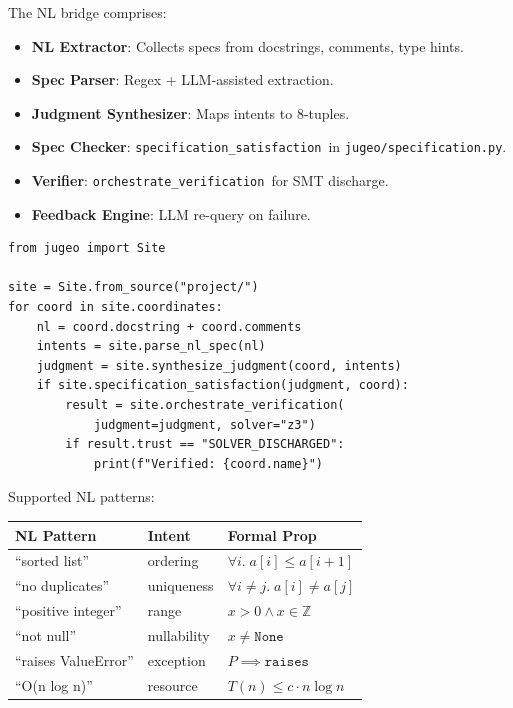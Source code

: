 \documentclass[11pt]{article}
\newcommand{\OrchestrateVerif}{\texttt{orchestrate\_verification}}
\newcommand{\SpecSatisfaction}{\texttt{specification\_satisfaction}}
\begin{document}
The NL bridge comprises:
\begin{itemize}[noitemsep]
  \item \textbf{NL Extractor}: Collects specs from docstrings,
        comments, type hints.
  \item \textbf{Spec Parser}: Regex + LLM-assisted extraction.
  \item \textbf{Judgment Synthesizer}: Maps intents to 8-tuples.
  \item \textbf{Spec Checker}: \SpecSatisfaction\ in
        \texttt{jugeo/specification.py}.
  \item \textbf{Verifier}: \OrchestrateVerif\ for SMT discharge.
  \item \textbf{Feedback Engine}: LLM re-query on failure.
\end{itemize}

\begin{lstlisting}[style=jugeo-python]
from jugeo import Site

site = Site.from_source("project/")
for coord in site.coordinates:
    nl = coord.docstring + coord.comments
    intents = site.parse_nl_spec(nl)
    judgment = site.synthesize_judgment(coord, intents)
    if site.specification_satisfaction(judgment, coord):
        result = site.orchestrate_verification(
            judgment=judgment, solver="z3")
        if result.trust == "SOLVER_DISCHARGED":
            print(f"Verified: {coord.name}")
\end{lstlisting}

Supported NL patterns:
\begin{center}
\begin{tabular}{lll}
\toprule
\textbf{NL Pattern} & \textbf{Intent} & \textbf{Formal Prop} \\
\midrule
``sorted list'' & ordering & $\forall i.\; a[i] \leq a[i+1]$ \\
``no duplicates'' & uniqueness & $\forall i \neq j.\; a[i] \neq a[j]$ \\
``positive integer'' & range & $x > 0 \land x \in \mathbb{Z}$ \\
``not null'' & nullability & $x \neq \texttt{None}$ \\
``raises ValueError'' & exception & $P \implies \texttt{raises}$ \\
``O(n log n)'' & resource & $T(n) \leq c \cdot n\log n$ \\
\bottomrule
\end{tabular}
\end{center}

\end{document}
